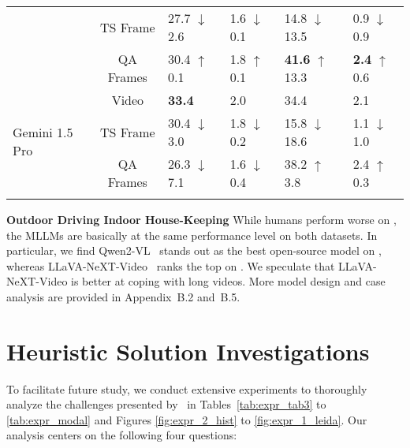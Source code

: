 {\begin{table}[t!]
{\begin{threeparttable}
\begin{tabular}{l|c|ll|ll}
& TS Frame &  27.7 {\color{red} $\downarrow$ 2.6} &   1.6 {\color{red} $\downarrow$ 0.1} &  14.8 {\color{red} $\downarrow$ 13.5} &  0.9 {\color{red} $\downarrow$ 0.9} \\ 
& QA Frames &  30.4 {\color{limegreen} $\uparrow$ 0.1}  &  1.8 {\color{limegreen} $\uparrow$ 0.1} &    \textbf{41.6} {\color{limegreen} $\uparrow$ 13.3} &   \textbf{2.4} {\color{limegreen} $\uparrow$ 0.6} \\ 
\hline
\multirow{3}{*}{Gemini 1.5 Pro~\cite{reid2024gemini}} & Video &  {\bf33.4} & {2.0}  &  34.4 & 2.1 \\ 
& TS Frame &  30.4 {\color{red} $\downarrow$ 3.0} & 1.8 {\color{red} $\downarrow$ 0.2} & 15.8 {\color{red} $\downarrow$ 18.6} & 1.1 {\color{red} $\downarrow$ 1.0} \\ 
& QA Frames & 26.3 {\color{red} $\downarrow$ 7.1} & 1.6 {\color{red} $\downarrow$ 0.4} & {38.2} {\color{limegreen} $\uparrow$ 3.8} & {2.4} {\color{limegreen} $\uparrow$ 0.3} \\ 
\Xhline{1pt}
\end{tabular}
\vspace{-0.6cm}
\end{threeparttable}}
\end{table}


\noindent\textbf{Outdoor Driving \vs Indoor House-Keeping} 
While humans perform worse on \datasetin, the MLLMs are basically at the same performance level on both datasets. In particular, we find Qwen2-VL~\cite{wang2024qwen2} stands out as the best open-source model on \datasetout, whereas LLaVA-NeXT-Video~\cite{zhang2024llavanextvideo} ranks the top on \datasetin. We speculate that LLaVA-NeXT-Video is better at coping with long videos. More model design and case analysis are provided in Appendix~{\color{red}B.2} and~{\color{red}B.5}.





\vspace{-0.2cm}
\section{Heuristic Solution Investigations}
To facilitate future study, we conduct extensive experiments to thoroughly analyze the challenges presented by \dataset~in Tables~\ref{tab:expr_tab3} to \ref{tab:expr_modal} and Figures \ref{fig:expr_2_hist} to \ref{fig:expr_1_leida}.  Our analysis centers on the following four questions: %



}
